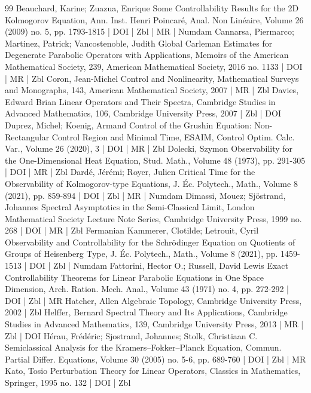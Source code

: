 \begin{thebibliography}{99}
Beauchard, Karine; Zuazua, Enrique Some Controllability Results for the 2D Kolmogorov Equation, Ann. Inst. Henri Poincaré, Anal. Non Linéaire, Volume 26 (2009) no. 5, pp. 1793-1815 | DOI | Zbl | MR | Numdam
Cannarsa, Piermarco; Martinez, Patrick; Vancostenoble, Judith Global Carleman Estimates for Degenerate Parabolic Operators with Applications, Memoirs of the American Mathematical Society, 239, American Mathematical Society, 2016 no. 1133 | DOI | MR | Zbl
Coron, Jean-Michel Control and Nonlinearity, Mathematical Surveys and Monographs, 143, American Mathematical Society, 2007 | MR | Zbl
Davies, Edward Brian Linear Operators and Their Spectra, Cambridge Studies in Advanced Mathematics, 106, Cambridge University Press, 2007 | Zbl | DOI
Duprez, Michel; Koenig, Armand Control of the Grushin Equation: Non-Rectangular Control Region and Minimal Time, ESAIM, Control Optim. Calc. Var., Volume 26 (2020), 3 | DOI | MR | Zbl
Dolecki, Szymon Observability for the One-Dimensional Heat Equation, Stud. Math., Volume 48 (1973), pp. 291-305 | DOI | MR | Zbl
Dardé, Jérémi; Royer, Julien Critical Time for the Observability of Kolmogorov-type Equations, J. Éc. Polytech., Math., Volume 8 (2021), pp. 859-894 | DOI | Zbl | MR | Numdam
Dimassi, Mouez; Sjöstrand, Johannes Spectral Asymptotics in the Semi-Classical Limit, London Mathematical Society Lecture Note Series, Cambridge University Press, 1999 no. 268 | DOI | MR | Zbl
Fermanian Kammerer, Clotilde; Letrouit, Cyril Observability and Controllability for the Schrödinger Equation on Quotients of Groups of Heisenberg Type, J. Éc. Polytech., Math., Volume 8 (2021), pp. 1459-1513 | DOI | Zbl | Numdam
Fattorini, Hector O.; Russell, David Lewis Exact Controllability Theorems for Linear Parabolic Equations in One Space Dimension, Arch. Ration. Mech. Anal., Volume 43 (1971) no. 4, pp. 272-292 | DOI | Zbl | MR
Hatcher, Allen Algebraic Topology, Cambridge University Press, 2002 | Zbl
Helffer, Bernard Spectral Theory and Its Applications, Cambridge Studies in Advanced Mathematics, 139, Cambridge University Press, 2013 | MR | Zbl | DOI
Hérau, Frédéric; Sjostrand, Johannes; Stolk, Christiaan C. Semiclassical Analysis for the Kramers–Fokker–Planck Equation, Commun. Partial Differ. Equations, Volume 30 (2005) no. 5-6, pp. 689-760 | DOI | Zbl | MR
Kato, Tosio Perturbation Theory for Linear Operators, Classics in Mathematics, Springer, 1995 no. 132 | DOI | Zbl

\end{thebibliography}
